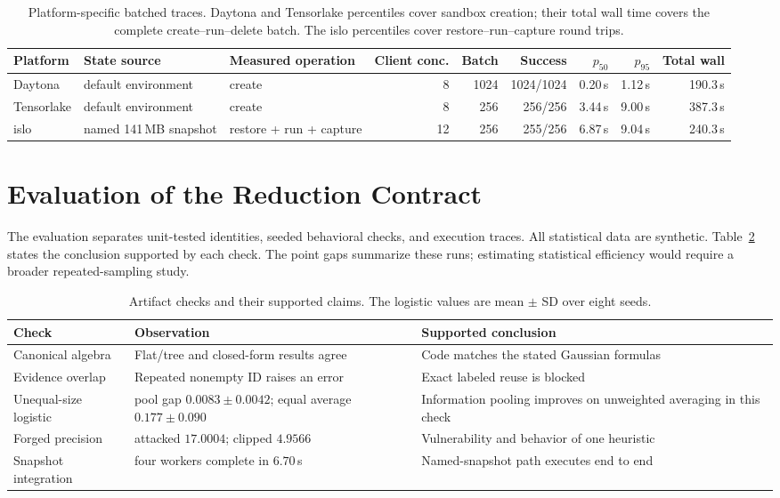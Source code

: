 \begin{table}[t]
\centering\scriptsize
\caption{Platform-specific batched traces. Daytona and Tensorlake percentiles cover sandbox
creation; their total wall time covers the complete create--run--delete batch. The islo
percentiles cover restore--run--capture round trips.}
\label{tab:platform}
\begin{tabularx}{\textwidth}{@{}l l >{\raggedright\arraybackslash}X r r r r r r@{}}
\toprule
Platform & State source & Measured operation & Client conc. & Batch & Success & $p_{50}$ & $p_{95}$ & Total wall \\
\midrule
Daytona & default environment & create & 8 & 1024 & 1024/1024 & 0.20\,s & 1.12\,s & 190.3\,s \\
Tensorlake & default environment & create & 8 & 256 & 256/256 & 3.44\,s & 9.00\,s & 387.3\,s \\
islo & named 141\,MB snapshot & restore + run + capture & 12 & 256 & 255/256 & 6.87\,s & 9.04\,s & 240.3\,s \\
\bottomrule
\end{tabularx}
\end{table}

\section{Evaluation of the Reduction Contract}
\label{sec:eval}

The evaluation separates unit-tested identities, seeded behavioral checks, and execution traces.
All statistical data are synthetic. Table~\ref{tab:checks} states the conclusion supported by
each check. The point gaps summarize these runs; estimating statistical efficiency would require
a broader repeated-sampling study.

\begin{table}[t]
\centering\footnotesize
\caption{Artifact checks and their supported claims. The logistic values are mean $\pm$ SD over
eight seeds.}
\label{tab:checks}
\begin{tabularx}{\columnwidth}{@{}>{\raggedright\arraybackslash}p{}>{\raggedright\arraybackslash}p{}X@{}}
\toprule
Check & Observation & Supported conclusion \\
\midrule
Canonical algebra & Flat/tree and closed-form results agree & Code matches the stated Gaussian formulas \\
Evidence overlap & Repeated nonempty ID raises an error & Exact labeled reuse is blocked \\
Unequal-size logistic & pool gap $0.0083\!\pm\!0.0042$; equal average $0.177\!\pm\!0.090$ & Information pooling improves on unweighted averaging in this check \\
Forged precision & attacked $17.0004$; clipped $4.9566$ & Vulnerability and behavior of one heuristic \\
Snapshot integration & four workers complete in $6.70$\,s & Named-snapshot path executes end to end \\
\bottomrule
\end{tabularx}
\end{table}


